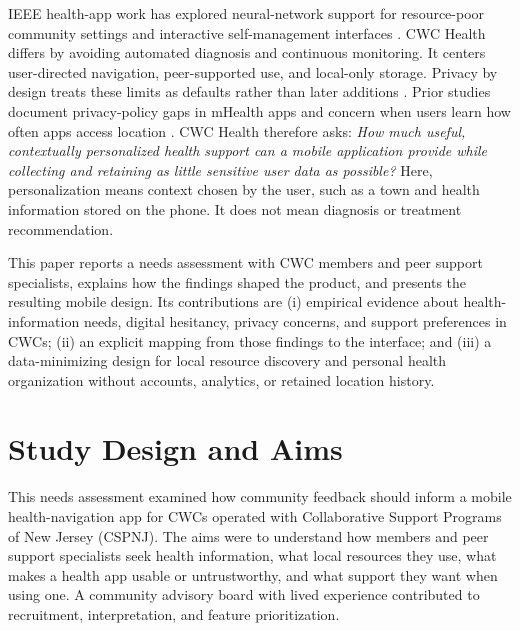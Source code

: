 \documentclass[conference,a4paper]{IEEEtran}
\begin{document}
IEEE health-app work has explored neural-network support for resource-poor
community settings and interactive self-management interfaces
\cite{Pasha2020CommunityHealth,Chiu2021SelfManagement}. CWC Health differs by
avoiding automated diagnosis and continuous monitoring. It centers
user-directed navigation, peer-supported use, and local-only storage. Privacy by
design treats these limits as defaults rather than later additions
\cite{Cavoukian2010PbDWorkshop}. Prior studies document privacy-policy gaps in
mHealth apps and concern when users learn how often apps access location
\cite{Alfawzan2022mHealthPrivacy,Almuhimedi2015LocationShared}. CWC Health
therefore asks: \emph{How much useful, contextually personalized health support
can a mobile application provide while collecting and retaining as little
sensitive user data as possible?} Here, personalization means context chosen by
the user, such as a town and health information stored on the phone. It does not
mean diagnosis or treatment recommendation.

This paper reports a needs assessment with CWC members and peer support
specialists, explains how the findings shaped the product, and presents the
resulting mobile design. Its contributions are (i) empirical evidence about
health-information needs, digital hesitancy, privacy concerns, and support
preferences in CWCs; (ii) an explicit mapping from those findings to the
interface; and (iii) a data-minimizing design for local resource discovery and
personal health organization without accounts, analytics, or retained location
history.

\section{Study Design and Aims}
This needs assessment examined how community feedback should inform a mobile
health-navigation app for CWCs operated with Collaborative Support Programs of
New Jersey (CSPNJ). The aims were to understand how members and peer support
specialists seek health information, what local resources they use, what makes a
health app usable or untrustworthy, and what support they want when using one. A
community advisory board with lived experience contributed to recruitment,
interpretation, and feature prioritization.
\end{document}

